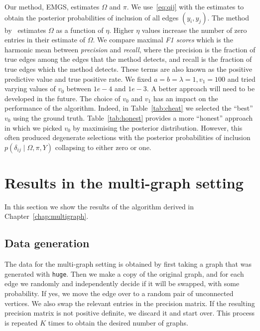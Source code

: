 \documentclass[a4paper, 11pt, oneside]{report}
\newcommand{\1}{\mathds{1}}
\begin{document}
Our method, EMGS, estimates $\Omega$ and $\pi$. We use~\eqref{eq:qij} with the
estimates to obtain the posterior probabilities of inclusion of all edges
$(y_i, y_j)$. The method by~\cite{mein2006} estimates $\Omega$ as a function of
$\eta$. Higher $\eta$ values increase the number of zero entries in their
estimate of $\Omega$.
We compare maximal \emph{F1 scores} which is the harmonic mean between \emph{precision}
and \emph{recall}, where the precision is the fraction of true edges
among the edges that the method detects, and recall is the fraction
of true edges which the method detects. These terms are also known as the
positive predictive value and true positive rate.
We fixed $a = b = \lambda = 1, v_1 = 100$ and tried varying
values of $v_0$ between $1e-4$ and $1e-3$.
A better approach will need to be developed in the future.
The choice of $v_0$ and $v_1$ has an impact on the performance of the algorithm.
Indeed, in Table~\ref{tab:cheat} we selected the ``best'' $v_0$ using the ground truth.
Table~\ref{tab:honest} provides a more ``honest'' approach in which we picked $v_0$ by
maximising the posterior distribution.
However, this often produced degenerate selections with the posterior
probabilities of inclusion $p(\delta_{ij} \mid \Omega, \pi, Y)$ collapsing to
either zero or one.

\section{Results in the multi-graph setting}
In this section we show the results of the algorithm derived in Chapter~\ref{chap:multigraph}.

\subsection{Data generation}\label{ssect:data-generation}
The data for the multi-graph setting is obtained by first taking a graph
that was generated with \texttt{huge}.
Then we make a copy of the original graph,
and for each edge we randomly and independently decide if it will be swapped, with some probability.
If yes, we move the edge over to a random pair of unconnected vertices.
We also swap the relevant entries in the precision matrix.
If the resulting precision matrix is not positive definite, we discard it and start over.
This process is repeated $K$ times to obtain the desired number of graphs.
\end{document}
